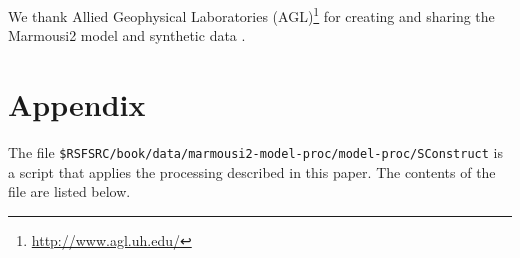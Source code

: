 We thank Allied Geophysical Laboratories (AGL)\footnote{\url{http://www.agl.uh.edu/}} for creating and sharing the 
Marmousi2 model and synthetic data \cite[]{SEG-2002-19791982}.  

\appendix
\section{Appendix}

The file \texttt{\$RSFSRC/book/data/marmousi2-model-proc/model-proc/SConstruct} 
is a script that applies the processing described in this paper.  The 
contents of the file are listed below.

\tiny
\lstset{language=python,numbers=left,numberstyle=\tiny,showstringspaces=false}

\normalsize







 
